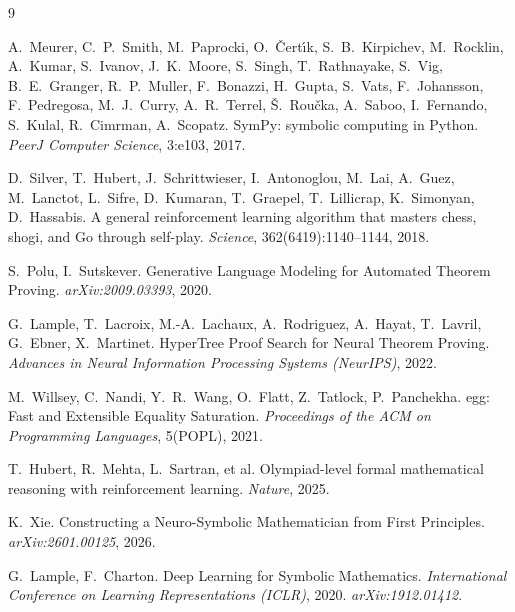 \documentclass[11pt]{article}
\numberwithin{equation}{section}
\begin{document}

\begin{thebibliography}{9}

A.~Meurer, C.~P.~Smith, M.~Paprocki, O.~\v{C}ert\'{\i}k, S.~B.~Kirpichev, M.~Rocklin, A.~Kumar, S.~Ivanov, J.~K.~Moore, S.~Singh, T.~Rathnayake, S.~Vig, B.~E.~Granger, R.~P.~Muller, F.~Bonazzi, H.~Gupta, S.~Vats, F.~Johansson, F.~Pedregosa, M.~J.~Curry, A.~R.~Terrel, \v{S}.~Rou\v{c}ka, A.~Saboo, I.~Fernando, S.~Kulal, R.~Cimrman, A.~Scopatz.
\newblock SymPy: symbolic computing in Python.
\newblock \emph{PeerJ Computer Science}, 3:e103, 2017.

D.~Silver, T.~Hubert, J.~Schrittwieser, I.~Antonoglou, M.~Lai, A.~Guez, M.~Lanctot, L.~Sifre, D.~Kumaran, T.~Graepel, T.~Lillicrap, K.~Simonyan, D.~Hassabis.
\newblock A general reinforcement learning algorithm that masters chess, shogi, and Go through self-play.
\newblock \emph{Science}, 362(6419):1140--1144, 2018.

S.~Polu, I.~Sutskever.
\newblock Generative Language Modeling for Automated Theorem Proving.
\newblock \emph{arXiv:2009.03393}, 2020.

G.~Lample, T.~Lacroix, M.-A.~Lachaux, A.~Rodriguez, A.~Hayat, T.~Lavril, G.~Ebner, X.~Martinet.
\newblock HyperTree Proof Search for Neural Theorem Proving.
\newblock \emph{Advances in Neural Information Processing Systems (NeurIPS)}, 2022.

M.~Willsey, C.~Nandi, Y.~R.~Wang, O.~Flatt, Z.~Tatlock, P.~Panchekha.
\newblock egg: Fast and Extensible Equality Saturation.
\newblock \emph{Proceedings of the ACM on Programming Languages}, 5(POPL), 2021.

T.~Hubert, R.~Mehta, L.~Sartran, et al.
\newblock Olympiad-level formal mathematical reasoning with reinforcement learning.
\newblock \emph{Nature}, 2025.

K.~Xie.
\newblock Constructing a Neuro-Symbolic Mathematician from First Principles.
\newblock \emph{arXiv:2601.00125}, 2026.

G.~Lample, F.~Charton.
\newblock Deep Learning for Symbolic Mathematics.
\newblock \emph{International Conference on Learning Representations (ICLR)}, 2020. \emph{arXiv:1912.01412}.


\end{thebibliography}
\end{document}
